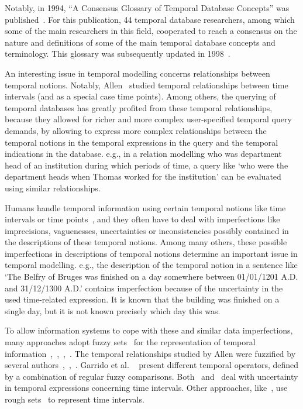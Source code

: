 Notably, in 1994, ``A Consensus Glossary of Temporal Database Concepts'' was published~\cite{Dyreson1994}. For this publication, 44 temporal database researchers, among which some of the main researchers in this field, cooperated to reach a consensus on the nature and definitions of some of the main temporal database concepts and terminology. This glossary was subsequently updated in 1998~\cite{Jensen:Dyreson:1998:TheConsensusGlossary}.

An interesting issue in temporal modelling concerns relationships between temporal notions. Notably, Allen~\cite{Allen83} studied temporal relationships between time intervals (and as a special case time points). Among others, the querying of temporal databases has greatly profited from these temporal relationships, because they allowed for richer and more complex user-specified temporal query demands, by allowing to express more complex relationships between the temporal notions in the temporal expressions in the query and the temporal indications in the database. e.g., in a relation modelling who was department head of an institution during which periods of time, a query like `who were the department heads when Thomas worked for the institution' can be evaluated using similar relationships.

Humans handle temporal information using certain temporal notions like time intervals or time points~\cite{Dyreson1994}, and they often have to deal with imperfections like imprecisions, vaguenesses, uncertainties or inconsistencies possibly contained in the descriptions of these temporal notions. Among many others, these possible imperfections in descriptions of temporal notions determine an important issue in temporal modelling. e.g., the description of the temporal notion in a sentence like `The Belfry of Bruges was finished on a day somewhere between 01/01/1201 A.D. and 31/12/1300 A.D.' contains imperfection because of the uncertainty in the used time-related expression. It is known that the building was finished on a single day, but it is not known precisely which day this was.

To allow information systems to cope with these and similar data imperfections, many approaches adopt fuzzy sets~\cite{Zadeh65} for the representation of temporal information~\cite{343607},~\cite{nagypal2003},~\cite{Billiet:Pons:Matthe:DeTre:Pons:2011:BipolarFuzzy},~\cite{Dubois:jucs_9_9:fuzziness_and_uncertainty_in}. The temporal relationships studied by Allen were fuzzified by several authors~\cite{ohlbach2004},~\cite{nagypal2003},~\cite{schockaert08}. Garrido et al. ~\cite{garrido2009} present different temporal operators, defined by a combination of regular fuzzy comparisons. Both~\cite{garrido2009} and~\cite{Pon11} deal with uncertainty in temporal expressions concerning time intervals. Other approaches, like~\cite{Qia09}, use rough sets~\cite{Pawlak1995} to represent time intervals.

